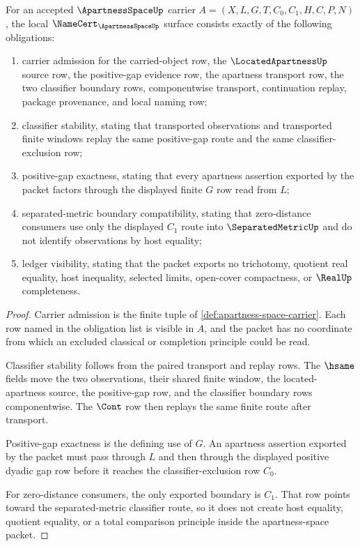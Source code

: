 \begin{theorem}
\label{thm:apartness-space-namecert-obligations}
For an accepted $\ApartnessSpaceUp$ carrier
$A=(X,L,G,T,C_0,C_1,H,C,P,N)$, the local
$\NameCert_{\ApartnessSpaceUp}$ surface consists exactly of the following
obligations:
\begin{enumerate}
\item carrier admission for the carried-object row, the
$\LocatedApartnessUp$ source row, the positive-gap evidence row, the
apartness transport row, the two classifier boundary rows, componentwise
transport, continuation replay, package provenance, and local naming row;
\item classifier stability, stating that transported observations and
transported finite windows replay the same positive-gap route and the same
classifier-exclusion row;
\item positive-gap exactness, stating that every apartness assertion exported
by the packet factors through the displayed finite $G$ row read from $L$;
\item separated-metric boundary compatibility, stating that zero-distance
consumers use only the displayed $C_1$ route into $\SeparatedMetricUp$ and do
not identify observations by host equality;
\item ledger visibility, stating that the packet exports no trichotomy,
quotient real equality, host inequality, selected limits, open-cover
compactness, or $\RealUp$ completeness.
\end{enumerate}
\end{theorem}
\begin{proof}
Carrier admission is the finite tuple of
\autoref{def:apartness-space-carrier}. Each row named in the obligation list
is visible in $A$, and the packet has no coordinate from which an excluded
classical or completion principle could be read.

Classifier stability follows from the paired transport and replay rows. The
$\hsame$ fields move the two observations, their shared finite window, the
located-apartness source, the positive-gap row, and the classifier boundary
rows componentwise. The $\Cont$ row then replays the same finite route after
transport.

Positive-gap exactness is the defining use of $G$. An apartness assertion
exported by the packet must pass through $L$ and then through the displayed
positive dyadic gap row before it reaches the classifier-exclusion row $C_0$.

For zero-distance consumers, the only exported boundary is $C_1$. That row
points toward the separated-metric classifier route, so it does not create
host equality, quotient equality, or a total comparison principle inside the
apartness-space packet.
\end{proof}

